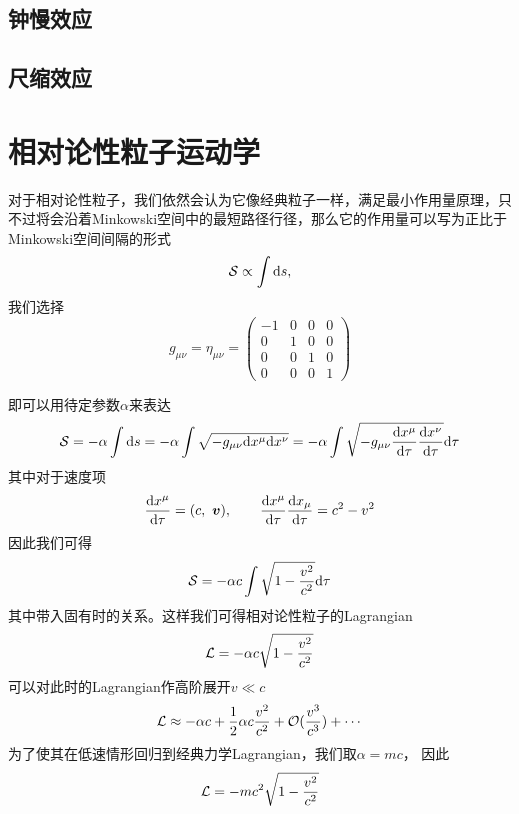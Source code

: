 \documentclass[a4paper]{report}
\begin{document}
\subsection*{钟慢效应}
\subsection*{尺缩效应}

\section{相对论性粒子运动学}
对于相对论性粒子，我们依然会认为它像经典粒子一样，满足最小作用量原理，只不过将会沿着Minkowski空间中的最短路径行径，那么它的作用量可以写为正比于Minkowski空间间隔的形式
\begin{equation}
    \mathcal{S} \propto \int \mathrm{d} s ,
\end{equation}
我们选择
    \begin{equation}
    g_{\mu\nu} = \eta_{\mu\nu} = \begin{pmatrix}
        -1& 0& 0& 0\\
        0& 1& 0& 0\\
        0& 0& 1& 0\\
        0& 0& 0& 1
    \end{pmatrix}
\end{equation}

即可以用待定参数$\alpha$来表达
\begin{equation}
    \mathcal{S} = -\alpha\int\mathrm{d} s = -\alpha\int\sqrt{-g_{\mu\nu}\mathrm{d} x^\mu \mathrm{d} x^\nu} = -\alpha\int \sqrt{-g_{\mu\nu}\frac{\mathrm{d} x^\mu}{\mathrm{d}\tau}\frac{\mathrm{d} x^\nu}{\mathrm{d}\tau}}\mathrm{d}\tau
\end{equation}
其中对于速度项
\begin{equation}
    \frac{\mathrm{d} x^\mu}{\mathrm{d} \tau} = (c, ~\boldsymbol{v}), \qquad\frac{\mathrm{d} x^\mu}{\mathrm{d} \tau}\frac{\mathrm{d} x_\mu}{\mathrm{d} \tau} = c^2-v^2
\end{equation}
因此我们可得
\begin{equation}
    \mathcal{S} =  -\alpha c \int\sqrt{1-\frac{v^2}{c^2}} \mathrm{d} \tau
\end{equation}
其中带入固有时的关系。这样我们可得相对论性粒子的Lagrangian
\begin{equation}
    \mathcal{L} = -\alpha c\sqrt{1-\frac{v^2}{c^2}}
\end{equation}
可以对此时的Lagrangian作高阶展开$v\ll c$
\begin{equation}
    \mathcal{L} \approx -\alpha c + \frac{1}{2}\alpha c\frac{v^2}{c^2} + \mathcal{O}(\frac{v^3}{c^3})+\cdots
\end{equation}
为了使其在低速情形回归到经典力学Lagrangian，我们取$\alpha = m c$， 因此
\begin{equation}
     \mathcal{L} = -m c^2\sqrt{1-\frac{v^2}{c^2}}
\end{equation}
\end{document}
